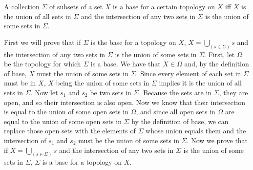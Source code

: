 \begin{majorEx}%
A collection $\Sigma$ of subsets of a set $X$ is a base for a certain topology on $X$ iff $X$ is the union of all sets in $\Sigma$ and
the intersection of any two sets in $\Sigma$ is the union of some sets in $\Sigma$.
\end{majorEx}
First we will prove that if $\Sigma$ is the base for a topology on $X$, $X = \bigcup_(s \in \Sigma) s$ and the intersection of any two sets in $\Sigma$ is the union of some sets in $\Sigma$. First, let $\Omega$ be the topology for which $\Sigma$ is a base. We have that $X \in \Omega$ and, by the definition of base, $X$ must the union of some sets in $\Sigma$. Since every element of each set in $\Sigma$ must be in $X$, $X$ being the union of some sets in $\Sigma$ implies it is the union of all sets in $\Sigma$. Now let $s_1$ and $s_2$ be two sets in $\Sigma$. Because the sets are in $\Sigma$, they are open, and so their intersection is also open. Now we know that their intersection is equal to the union of some open sets in $\Omega$, and since all open sets in $\Omega$ are equal to the union of some open sets in $\Sigma$ by the definition of base, we can replace those open sets with the elements of $\Sigma$ whose union equals them and the intersection of $s_1$ and $s_2$ must be the union of some sets in $\Sigma$.
Now we prove that if $X = \bigcup_(s \in \Sigma) s$ and the intersection of any two sets in $\Sigma$ is the union of some sets in $\Sigma$, $\Sigma$ is a base for a topology on $X$.

